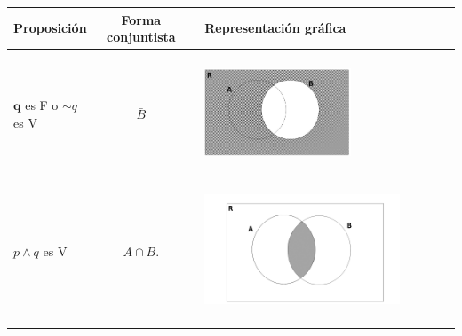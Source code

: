 \documentclass[12pt]{article}
\theoremstyle{definition}
\theoremstyle{remark}
\begin{document}
\begin{enumerate}
\begin{table}[ H]
\begin{center} 
\begin{tabular} { l c c l }
\textbf{Proposición}&\textbf{Forma conjuntista}& & \textbf{Representación gráfica}\\ \hline  \\ 
$\textbf{q}$  es F o $\sim q $ es V &$\bar{B}$& & 
\begin{minipage}{5cm} 
\begin{center} 
\includegraphics[width=0.6\textwidth]{TP1Fig4.jpg} 
\end{center}
\end{minipage}\\ \\ 

 $p \wedge q$ es V &$A \cap B.$ & &
\begin{minipage}{5cm} 
\begin{center} 
\includegraphics[width=0.8\textwidth]{11b.png} 
\end{center}
\end{minipage}\\ \\  


\end{tabular}
\end{center}
\end{table}
\end{enumerate}
\end{document}
